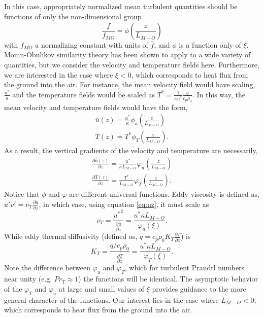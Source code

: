 In this case, appropriately normalized mean turbulent quantities should
be functions of only the non-dimensional group 
\begin{equation}
 \frac{\bar f}{f_{MO}} = \phi(\frac{z}{L_{M-O}})
\end{equation}
with $f_{MO}$ a normalizing constant with units of $\bar f$, and $\phi$
is a function only of $\xi$. Monin-Obuhkov similarity theory has been
shown to apply to a wide variety of
quantities\cite{wyngaard2010turbulence}, but we consider the velocity
and temperature fields here.  
Furthermore, we are interested in the case where
$\xi<0$, which corresponds to heat flux from the ground into the
air. For instance, the mean velocity field would have scaling,
$\frac{u^*}{\kappa}$ and the temperature fields would be scaled as $T^*
= \frac{1}{\kappa u^*} \frac{q}{c_p \rho_0}$. In this way, the mean
velocity and temperature fields would have the form,  
\begin{eqnarray}
\bar u(z) = \frac{u^*}{\kappa} \phi_u(\frac{z}{L_{M-O}}) \\
\bar T(z) = T^* \phi_T(\frac{z}{L_{M-O}}).
\end{eqnarray}
As a result, the vertical gradients of the velocity and temperature are
necessarily, 
\begin{eqnarray}
\frac{\partial \bar u(z)}{\partial z} = \frac{u^*}{\kappa L_{M-O}}
 \varphi_u(\frac{z}{L_{M-O}}) \label{eq:uz} \\ 
\frac{\partial \bar T(z)}{\partial z} = \frac{T^*}{L_{M-O}}
 \varphi_T(\frac{z}{L_{M-O}}) \label{eq:tz}.
\end{eqnarray}
Notice that $\phi$ and $\varphi$ are different universal functions. Eddy
viscosity is defined as, $u'v' = \nu_T \frac{\partial
u}{\partial z}$\cite{durbin2001statistical}, in which case, using
equation \ref{eq:uz}, it must scale as
\begin{equation}
 \nu_T = \frac{{u^*}^2}{\frac{\partial \bar u}{\partial z}} = \frac{u^*
  \kappa L_{M-O}}{\varphi_u(\xi)}.
\end{equation}
While eddy thermal diffusivity (defined as, $q = c_p \rho_0 K_T
\frac{\partial T}{\partial z}$) is 
\begin{equation}
 K_T = \frac{q/c_p \rho_0}{\frac{\partial \bar T}{\partial z}} = \frac{u^*
  \kappa L_{M-O}}{\varphi_T(\xi)}.
\label{eqn:eddy_kt}
\end{equation}
Note the difference between $\varphi_u$ and
$\varphi_T$, which for turbulent Prandtl numbers near unity (e.g. $Pr_T
\approx 1$) the functions will be identical. The asymptotic behavior of
the $\varphi_T$ and $\varphi_u$ at large and small values of $\xi$
provides guidance to the more general character of the functions. 
Our interest lies in the case where $L_{M-O}<0$, which corresponds to heat flux
from the ground into the air.  
%


